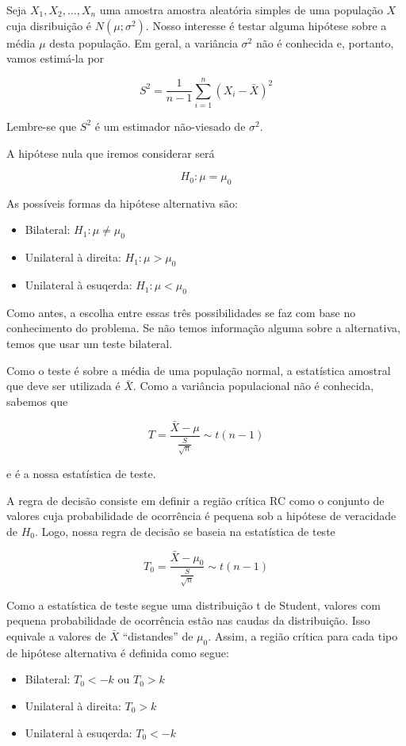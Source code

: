 \documentclass[
]{book}
\providecommand{\tightlist}{%
  \setlength{\itemsep}{0pt}\setlength{\parskip}{0pt}}
\begin{document}
Seja \(X_1,X_2,\ldots,X_n\) uma amostra amostra aleatória simples de uma população \(X\) cuja disribuição é \(N(\mu; \sigma^2)\). Nosso interesse é testar alguma hipótese sobre a média \(\mu\) desta população. Em geral, a variância \(\sigma^2\) não é conhecida e, portanto, vamos estimá-la por

\[S^2=\frac{1}{n-1}\sum_{i=1}^n \left(X_i-\bar X\right)^2\]

Lembre-se que \(S^2\) é um estimador não-viesado de \(\sigma^2\).

A hipótese nula que iremos considerar será

\[H_0:\mu=\mu_0\]

As possíveis formas da hipótese alternativa são:

\begin{itemize}
\tightlist
\item
  Bilateral: \(H_1:\mu\ne\mu_0\)
\item
  Unilateral à direita: \(H_1:\mu > \mu_0\)
\item
  Unilateral à esuqerda: \(H_1:\mu < \mu_0\)
\end{itemize}

Como antes, a escolha entre essas três possibilidades se faz com base no conhecimento do problema. Se não temos informação alguma sobre a alternativa, temos que usar um teste bilateral.

Como o teste é sobre a média de uma população normal, a estatística amostral que deve ser utilizada é \(\bar X\). Como a variância populacional não é conhecida, sabemos que

\[T=\frac{\bar X-\mu}{\frac{S}{\sqrt n}} \sim t(n-1)\]

e é a nossa estatística de teste.

A regra de decisão consiste em definir a região crítica RC como o conjunto de valores cuja probabilidade de ocorrência é pequena sob a hipótese de veracidade de \(H_0\). Logo, nossa regra de decisão se baseia na estatística de teste

\[T_0=\frac{\bar X-\mu_0}{\frac{S}{\sqrt n}} \sim t(n-1)\]

Como a estatística de teste segue uma distribuição t de Student, valores com pequena probabilidade de ocorrência estão nas caudas da distribuição. Isso equivale a valores de \(\bar X\) ``distandes'' de \(\mu_0\). Assim, a região crítica para cada tipo de hipótese alternativa é definida como segue:

\begin{itemize}
\tightlist
\item
  Bilateral: \(T_0 < -k\) ou \(T_0 > k\)
\item
  Unilateral à direita: \(T_0 > k\)
\item
  Unilateral à esuqerda: \(T_0 < -k\)
\end{itemize}
\end{document}

